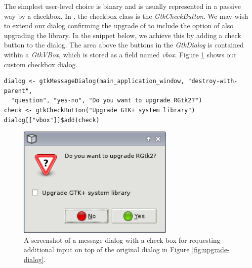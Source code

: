 \documentclass[article]{jss}
\begin{document}
The simplest user-level choice is binary and is usually represented in a passive
way by a checkbox. In , the checkbox class is the
\emph{GtkCheckButton}. We may wish to extend our dialog confirming the
upgrade of  to include the option of also upgrading the
 library. In the snippet below, we achieve this by adding a
check button to the dialog.  The area above the buttons in the
\emph{GtkDialog} is contained within a \emph{GtkVBox}, which is stored
as a field named \emph{vbox}. Figure \ref{fig:checkbox-dialog} shows
our custom checkbox dialog.
\begin{verbatim}
dialog <- gtkMessageDialog(main_application_window, "destroy-with-parent", 
  "question", "yes-no", "Do you want to upgrade RGtk2?")
check <- gtkCheckButton("Upgrade GTK+ system library")
dialog[["vbox"]]$add(check)
\end{verbatim}

\begin{figure}
\begin{center}
\includegraphics[width=3in]{checkbox-dialog.png}
\caption{\label{fig:checkbox-dialog}A screenshot of a message dialog with a 
check box for requesting additional input on top of the
original dialog in Figure \ref{fig:upgrade-dialog}.}
\end{center}
\end{figure}
\end{document}
